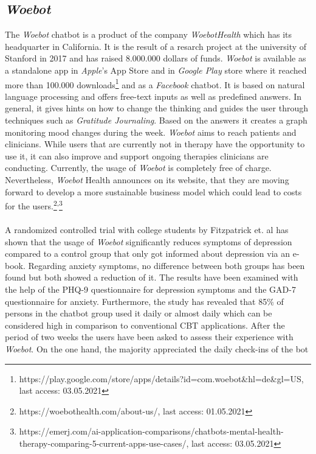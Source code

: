 \documentclass[sigconf, nonacm]{acmart}
\begin{document}
\subsection{\emph{Woebot}}
\label{sec:two_one}
The \emph{Woebot} chatbot is a product of the company \emph{WoebotHealth} which has its headquarter in California. It is the result of a resarch 
project at the university of Stanford in 2017 and has raised 8.000.000 dollars of funds.
\emph{Woebot} is available as a standalone app in \emph{Apple}'s App Store and in \emph{Google Play} store where it reached more than 100.000 downloads\footnote{https://play.google.com/store/apps/details?id=com.woebot\&hl=de\&gl=US, last access: 03.05.2021} and as 
a \emph{Facebook} chatbot. It is based on natural language processing and offers free-text inputs as well as predefined answers.
In general, it gives hints on how to change the thinking and guides the user through techniques such as \emph{Gratitude Journaling}. 
Based on the answers it creates a graph monitoring mood changes during the week.
\emph{Woebot} aims to reach patients and clinicians. While users that are currently not in therapy have the opportunity to use it,
it can also improve and support ongoing therapies clinicians are conducting.
Currently, the usage of \emph{Woebot} is completely free of charge. Nevertheless, \emph{Woebot} Health announces on its website, that they are moving forward
to develop a more sustainable business model which could lead to costs for the users.\footnote{https://woebothealth.com/about-us/, last access: 01.05.2021}\textsuperscript{,}\footnote{https://emerj.com/ai-application-comparisons/chatbots-mental-health-therapy-comparing-5-current-apps-use-cases/, last access: 03.05.2021}
\\\\
A randomized controlled trial with college students by Fitzpatrick et. al \cite{Fitzpatrick2017} has shown that the usage of \emph{Woebot} significantly reduces
symptoms of depression compared to a control group that only got informed about depression via an e-book. Regarding anxiety symptoms, no difference between
both groups has been found but both showed a reduction of it. The results have been examined with the help of the PHQ-9 questionnaire for depression symptoms and the GAD-7 questionnaire for anxiety. Furthermore, the study has revealed that 85\% of persons in the chatbot group used 
it daily or almost daily which can be considered high in comparison to conventional CBT applications\cite{Ludden2015}.
After the period of two weeks the users have been asked to assess their experience with \emph{Woebot}. On the one hand, the majority appreciated the daily check-ins of the bot 
\end{document}
